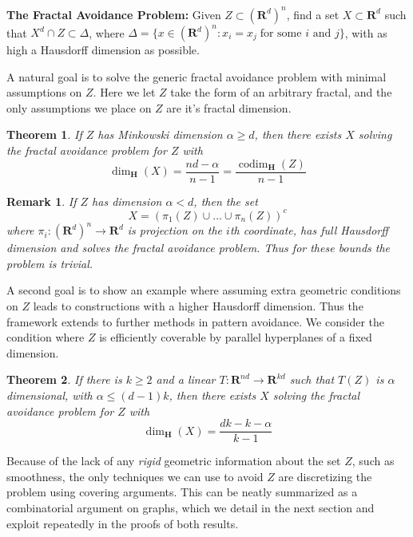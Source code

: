 \documentclass{article}
\theoremstyle{plain}
\theoremstyle{plain}
\newtheorem{theorem}{Theorem}
\newtheorem*{remark}{Remark}
\DeclareMathOperator{\codim}{codim}
\begin{document}
\begin{multicols}{2}
\begin{changemargin}{0.5em}{0em}
	{\bf The Fractal Avoidance Problem:} Given $Z \subset (\mathbf{R}^d)^n$, find a set $X \subset \mathbf{R}^d$ such that $X^d \cap Z \subset \Delta$, where $\Delta = \{ x \in (\mathbf{R}^d)^n : x_i = x_j\; \text{for some $i$ and $j$} \}$, with as high a Hausdorff dimension as possible.
\end{changemargin}

A natural goal is to solve the generic fractal avoidance problem with minimal assumptions on $Z$. Here we let $Z$ take the form of an arbitrary fractal, and the only assumptions we place on $Z$ are it's fractal dimension.

\begin{theorem}
	If $Z$ has Minkowski dimension $\alpha \geq d$, then there exists $X$ solving the fractal avoidance problem for $Z$ with
	\[ \dim_{\mathbf{H}}(X) = \frac{nd - \alpha}{n - 1} = \frac{\codim_{\mathbf{H}}(Z)}{n - 1} \]
\end{theorem}

\begin{remark}
	If $Z$ has dimension $\alpha < d$, then the set
	\[ X = (\pi_1(Z) \cup \dots \cup \pi_n(Z))^c \]
	where $\pi_i: (\mathbf{R}^d)^n \to \mathbf{R}^d$ is projection on the $i$th coordinate, has full Hausdorff dimension and solves the fractal avoidance problem. Thus for these bounds the problem is trivial.
\end{remark}


A second goal is to show an example where assuming extra geometric conditions on $Z$ leads to constructions with a higher Hausdorff dimension. Thus the framework extends to further methods in pattern avoidance. We consider the condition where $Z$ is efficiently coverable by parallel hyperplanes of a fixed dimension.

\begin{theorem}
	If there is $k \geq 2$ and a linear $T: \mathbf{R}^{nd} \to \mathbf{R}^{kd}$ such that $T(Z)$ is $\alpha$ dimensional, with $\alpha \leq (d-1)k$, then there exists $X$ solving the fractal avoidance problem for $Z$ with
	\[ \dim_{\mathbf{H}}(X) = \frac{dk - k - \alpha}{k-1} \]
\end{theorem}

Because of the lack of any {\it rigid} geometric information about the set $Z$, such as smoothness, the only techniques we can use to avoid $Z$ are discretizing the problem using covering arguments. This can be neatly summarized as a combinatorial argument on graphs, which we detail in the next section and exploit repeatedly in the proofs of both results.


\end{multicols}
\end{document}
